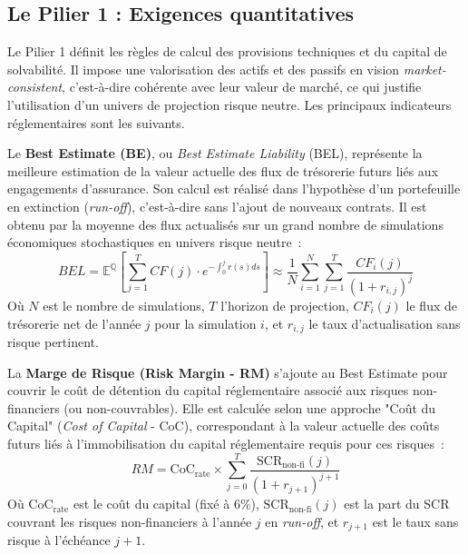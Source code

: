 \subsection{Le Pilier 1 : Exigences quantitatives}

Le Pilier 1 définit les règles de calcul des provisions techniques et du capital de solvabilité. Il impose une valorisation des actifs et des passifs en vision \textit{market-consistent}, c'est-à-dire cohérente avec leur valeur de marché, ce qui justifie l'utilisation d'un univers de projection risque neutre. Les principaux indicateurs réglementaires sont les suivants.

\bigskip

Le \textbf{Best Estimate (BE)}, ou \textit{Best Estimate Liability} (BEL), représente la meilleure estimation de la valeur actuelle des flux de trésorerie futurs liés aux engagements d'assurance. Son calcul est réalisé dans l'hypothèse d'un portefeuille en extinction (\textit{run-off}), c'est-à-dire sans l'ajout de nouveaux contrats. Il est obtenu par la moyenne des flux actualisés sur un grand nombre de simulations économiques stochastiques en univers risque neutre~:
\begin{equation}
    BEL = \mathbb{E}^{\mathbb{Q}} \left[ \sum_{j=1}^{T} CF(j) \cdot e^{-\int_0^j r(s)ds} \right] \approx \frac{1}{N}\sum_{i=1}^{N}\sum_{j=1}^{T}\frac{CF_{i}(j)}{(1+r_{i,j})^{j}}
\end{equation}
Où $N$ est le nombre de simulations, $T$ l'horizon de projection, $CF_{i}(j)$ le flux de trésorerie net de l'année $j$ pour la simulation $i$, et $r_{i,j}$ le taux d'actualisation sans risque pertinent.

\bigskip

La \textbf{Marge de Risque (Risk Margin - RM)} s'ajoute au Best Estimate pour couvrir le coût de détention du capital réglementaire associé aux risques non-financiers (ou non-couvrables). Elle est calculée selon une approche "Coût du Capital" (\textit{Cost of Capital} - CoC), correspondant à la valeur actuelle des coûts futurs liés à l'immobilisation du capital réglementaire requis pour ces risques~:
\begin{equation}
    RM = \text{CoC}_{\text{rate}} \times \sum_{j=0}^{T} \frac{\text{SCR}_{\text{non-fi}}(j)}{(1+r_{j+1})^{j+1}}
\end{equation}
Où $\text{CoC}_{\text{rate}}$ est le coût du capital (fixé à 6\%), $\text{SCR}_{\text{non-fi}}(j)$ est la part du SCR couvrant les risques non-financiers à l'année $j$ en \textit{run-off}, et $r_{j+1}$ est le taux sans risque à l'échéance $j+1$.

